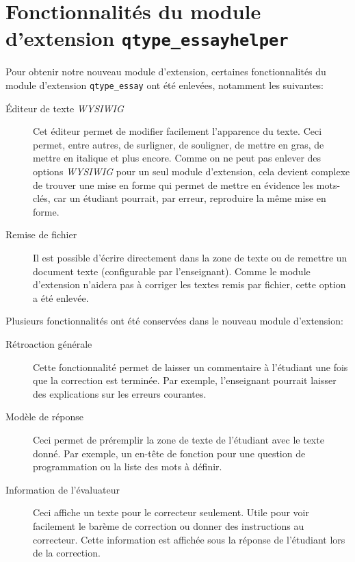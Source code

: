 \section{Fonctionnalit\'es du module d'extension \texttt{qtype\_essayhelper}}
Pour obtenir notre nouveau module d'extension,
certaines fonctionnalit\'es du module d'extension \texttt{qtype\_essay} ont \'et\'e enlev\'ees, notamment les suivantes:
\begin{description}
  \item[\'Editeur de texte \textit{WYSIWIG}]
  
  Cet \'editeur permet de modifier facilement l'apparence du texte.
  Ceci permet, entre autres, de surligner, de souligner, de mettre en gras, de mettre en italique et plus encore.
  Comme on ne peut pas enlever des options \textit{WYSIWIG} pour un seul module d'extension, cela devient complexe de trouver une mise en forme qui permet de mettre en \'evidence les mots-cl\'es, car un \'etudiant pourrait, par erreur, reproduire la m\^eme mise en forme.
  
  \item[Remise de fichier]
  
  Il est possible d'\'ecrire directement dans la zone de texte ou de remettre un document texte (configurable par l'enseignant).
  Comme le module d'extension n'aidera pas \`a corriger les textes remis par fichier, cette option a \'et\'e enlev\'ee.
\end{description}
Plusieurs fonctionnalit\'es ont \'et\'e conserv\'ees dans le nouveau module d'extension:
\begin{description}
  \item[R\'etroaction g\'en\'erale]
  
  Cette fonctionnalit\'e permet de laisser un commentaire \`a l'\'etudiant une fois que la correction est termin\'ee.
  Par exemple, l'enseignant pourrait laisser des explications sur les erreurs courantes.
  
  \item[Mod\`ele de r\'eponse]
  
  Ceci permet de pr\'eremplir la zone de texte de l'\'etudiant avec le texte donn\'e.
  Par exemple, un en-t\^ete de fonction pour une question de programmation ou la liste des mots \`a d\'efinir.
  
  \item[Information de l'\'evaluateur]
  
  Ceci affiche un texte pour le correcteur seulement.
  Utile pour voir facilement le bar\`eme de correction ou donner des instructions au correcteur.
  Cette information est affich\'ee sous la r\'eponse de l'\'etudiant lors de la correction.
\end{description}
